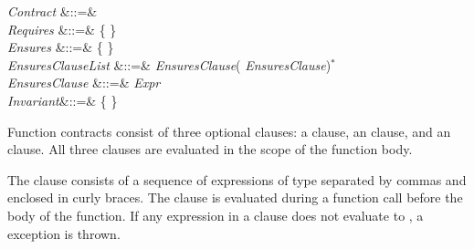 \begin{Grammar}
\emph{Contract} &::=&   \\

\emph{Requires} &::=&
 \{  \} \\

\emph{Ensures}  &::=&
 \{  \} \\

\emph{EnsuresClauseList} &::=&
\emph{EnsuresClause}(\EXP{,} \emph{EnsuresClause})$^*$ \\

\emph{EnsuresClause} &::=& \emph{Expr}  \\

\emph{Invariant}&::=&
 \{  \} \\

\end{Grammar}

Function contracts consist of three optional clauses: a 
clause, an  clause, and an  clause.
All three clauses are evaluated in the scope of the function body.


The   clause consists of a sequence of
expressions of type  separated by commas and
enclosed in curly braces.
The  clause is evaluated during a function call before
the body of the function. If any expression in a  clause
does not evaluate to , a  exception is
thrown.

